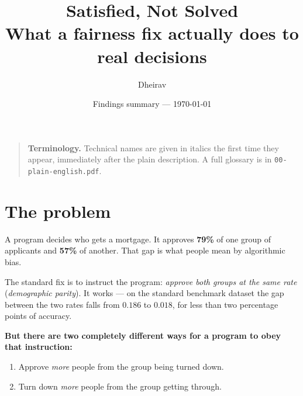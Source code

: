 \documentclass[11pt,a4paper]{article}
\title{\textbf{Satisfied, Not Solved}\\[2mm]
\large What a fairness fix actually does to real decisions}
\author{Dheirav}
\date{Findings summary --- \today}
\newcommand{\jargon}[1]{\emph{#1}}
\begin{document}
\maketitle

\begin{center}
\end{center}

\begin{quote}
\small \textbf{Terminology.} Technical names are given in italics the first time they
appear, immediately after the plain description. A full glossary is in
\texttt{00-plain-english.pdf}.
\end{quote}

\section{The problem}

A program decides who gets a mortgage. It approves \textbf{79\%} of one group of applicants
and \textbf{57\%} of another. That gap is what people mean by algorithmic bias.

The standard fix is to instruct the program: \emph{approve both groups at the same rate}
(\jargon{demographic parity}). It works --- on the standard benchmark dataset the gap
between the two rates falls from $0.186$ to $0.018$, for less than two percentage points of
accuracy.

\textbf{But there are two completely different ways for a program to obey that
instruction:}

\begin{enumerate}
\item Approve \emph{more} people from the group being turned down.
\item Turn down \emph{more} people from the group getting through.
\end{enumerate}
\end{document}
